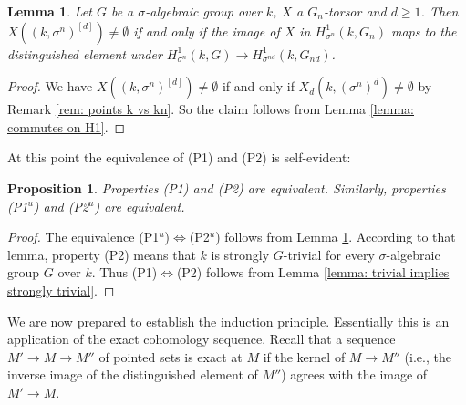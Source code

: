 \documentclass[oneside,reqno]{amsart}
\newtheorem{lemma}[theo]{Lemma}
\newtheorem{prop}[theo]{Proposition}
\theoremstyle{definition}
\newcommand{\s}{\sigma}
\newcommand{\po}{{\rm{(P1$^u$)}}}
\newcommand{\pw}{{\rm{(P2$^u$)}}}
\newcommand{\poweak}{{\rm{(P1)}}}
\newcommand{\pwweak}{{\rm{(P2)}}}
\begin{document}
\begin{lemma} \label{lemma: Gtriviality and H1}
Let $G$ be a $\s$-algebraic group over $k$, $X$ a $G_n$-torsor and $d\geq 1$. Then $X((k,\s^n)^{[d]})\neq\emptyset$ if and only if the image of $X$ in $H^1_{\s^n}(k,G_n)$ maps to the distinguished element under  $H^1_{\s^{n}}(k,G)\to H^1_{\s^{nd}}(k,G_{nd})$.
\end{lemma}
\begin{proof}
	We have $X((k,\s^n)^{[d]})\neq\emptyset$ if and only if $X_d(k,(\s^n)^d)\neq\emptyset$ by Remark \ref{rem: points k vs kn}. So the claim follows from Lemma \ref{lemma: commutes on H1}. 
\end{proof}

At this point the equivalence of \poweak{} and \pwweak{} is self-evident:

\begin{prop}\label{prop: P2 implies P1}
Properties \poweak{} and \pwweak{} are equivalent. Similarly, properties \po{} and \pw{} are equivalent.
\end{prop}
\begin{proof}
	The equivalence \po{}$\Leftrightarrow$\pw{} follows from Lemma \ref{lemma: Gtriviality and H1}. According to that lemma, property \pwweak{} means that $k$ is strongly $G$-trivial for every $\s$-algebraic group $G$ over $k$. Thus \poweak{}$\Leftrightarrow$\pwweak{} follows from Lemma \ref{lemma: trivial implies strongly trivial}.
\end{proof}	




We are now prepared to establish the induction principle. Essentially this is an application of the exact cohomology sequence. Recall that a sequence $M'\to M\to M''$ of pointed sets is exact at $M$ if the kernel of $M\to M''$ (i.e., the inverse image of the distinguished element of $M''$) agrees with the image of $M'\to M$.
\end{document}
